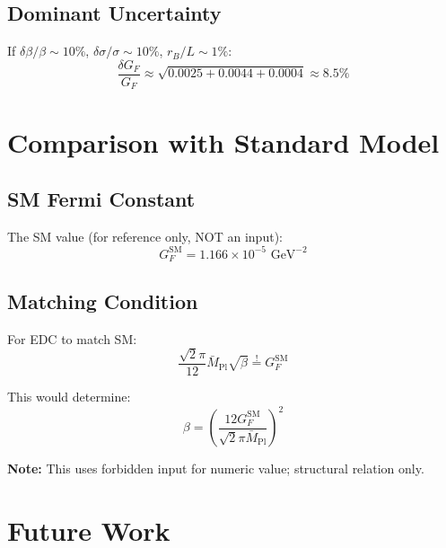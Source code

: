 \documentclass[11pt,a4paper]{article}
\begin{document}
\subsection{Dominant Uncertainty}
\label{app:dominant-error}

If $\delta\beta/\beta \sim 10\%$, $\delta\sigma/\sigma \sim 10\%$, $r_B/L \sim 1\%$:
\begin{equation}
\label{eq:dominant-error}
\frac{\delta G_F}{G_F} \approx \sqrt{0.0025 + 0.0044 + 0.0004} \approx 8.5\%
\end{equation}

\section{Comparison with Standard Model}
\label{app:sm-comparison}

\subsection{SM Fermi Constant}
\label{app:sm-gf}

The SM value (for reference only, NOT an input):
\begin{equation}
\label{eq:sm-gf-value}
G_F^{\text{SM}} = 1.166 \times 10^{-5} \text{ GeV}^{-2}
\end{equation}

\subsection{Matching Condition}
\label{app:matching-condition}

For EDC to match SM:
\begin{equation}
\label{eq:matching-cond}
\frac{\sqrt{2}\pi}{12} \bar{M}_{\text{Pl}} \sqrt{\beta} \stackrel{!}{=} G_F^{\text{SM}}
\end{equation}

This would determine:
\begin{equation}
\label{eq:beta-from-match}
\beta = \left(\frac{12 G_F^{\text{SM}}}{\sqrt{2}\pi \bar{M}_{\text{Pl}}}\right)^2
\end{equation}

\textbf{Note:} This uses forbidden input for numeric value; structural relation only.

\section{Future Work}
\label{app:future}
\end{document}

